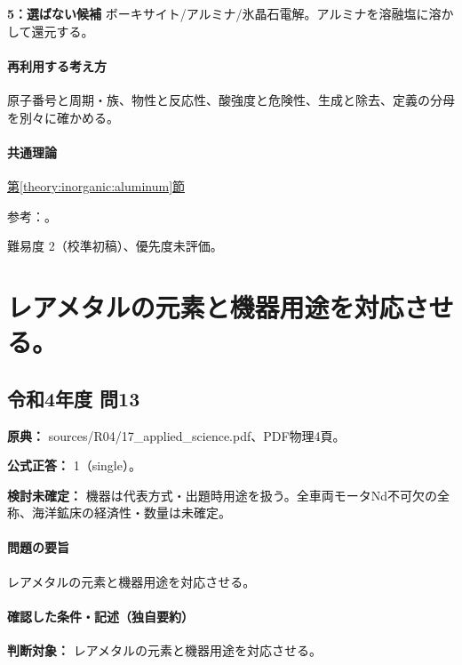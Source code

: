 \noindent\textbf{5：選ばない候補} ボーキサイト/アルミナ/氷晶石電解。アルミナを溶融塩に溶かして還元する。\par

\paragraph{再利用する考え方} 原子番号と周期・族、物性と反応性、酸強度と危険性、生成と除去、定義の分母を別々に確かめる。

\paragraph{共通理論} \hyperref[theory:inorganic:aluminum]{第\ref*{theory:inorganic:aluminum}節}

\par 参考：\cite{inorganic_al_ref}。

\par 難易度 2（校準初稿）、優先度未評価。

\section{レアメタルの元素と機器用途を対応させる。}

\subsection{令和4年度 問13}
\label{q:r04-reg-applied-13}

\noindent\textbf{原典：} sources/R04/17\_applied\_science.pdf、PDF物理4頁。

\textbf{公式正答：} 1（single）。

\par\textbf{検討未確定：} 機器は代表方式・出題時用途を扱う。全車両モータNd不可欠の全称、海洋鉱床の経済性・数量は未確定。

\paragraph{問題の要旨} レアメタルの元素と機器用途を対応させる。

\paragraph{確認した条件・記述（独自要約）}\mbox{}\par

\noindent\textbf{判断対象：} レアメタルの元素と機器用途を対応させる。\par

